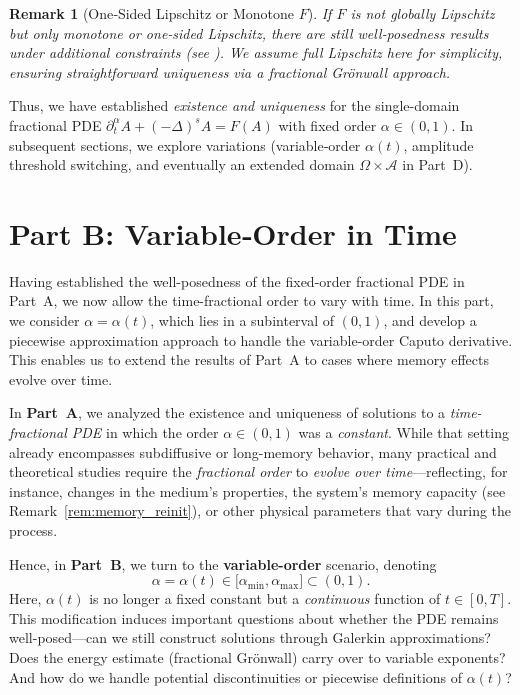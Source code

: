 \documentclass[12pt]{article}
\newtheorem{remark}[theorem]{Remark}
\begin{document}
\begin{remark}[One‐Sided Lipschitz or Monotone \(F\)]
If \(F\) is not globally Lipschitz but only monotone or one‐sided Lipschitz, there are
still well‐posedness results under additional constraints (see
\cite[Ch.~7]{Diethelm2010}).  We assume full Lipschitz here for simplicity, ensuring
straightforward uniqueness via a fractional Grönwall approach.
\end{remark}

\smallskip

Thus, we have established \emph{existence and uniqueness} for the single-domain fractional
PDE
\(\partial_t^\alpha A + (-\Delta)^s A = F(A)\) with fixed order \(\alpha\in(0,1)\).
In subsequent sections, we explore variations (variable‐order \(\alpha(t)\), amplitude
threshold switching, and eventually an extended domain \(\Omega\times\mathcal{A}\) in
Part~D).

\section{Part B: Variable‐Order in Time}
\label{sec:var_order}

Having established the well-posedness of the fixed-order fractional PDE in Part~A, 
we now allow the time-fractional order to vary with time. In this part, we consider 
$\alpha=\alpha(t)$, which lies in a subinterval of $(0,1)$, and develop a piecewise 
approximation approach to handle the variable-order Caputo derivative. This enables us 
to extend the results of Part~A to cases where memory effects evolve over time.

In \textbf{Part~A}, we analyzed the existence and uniqueness of solutions to a
\emph{time-fractional PDE} in which the order $\alpha\in(0,1)$ was a \emph{constant}.
While that setting already encompasses subdiffusive or long-memory behavior, many
practical and theoretical studies require the \emph{fractional order} to
\emph{evolve over time}---reflecting, for instance, changes in the medium's properties,
the system's memory capacity (see Remark~\ref{rem:memory_reinit}), or other physical parameters that vary during the process. 

Hence, in \textbf{Part~B}, we turn to the \textbf{variable-order} scenario, denoting
\[
\alpha=\alpha(t)\in \bigl[\alpha_{\min},\alpha_{\max}\bigr]\subset(0,1).
\]
Here, $\alpha(t)$ is no longer a fixed constant but a \emph{continuous} function of
$t\in[0,T]$. This modification induces important questions about whether the PDE
remains well-posed---can we still construct solutions through Galerkin approximations?
Does the energy estimate (fractional Grönwall) carry over to variable exponents? And how
do we handle potential discontinuities or piecewise definitions of $\alpha(t)$?
\end{document}
